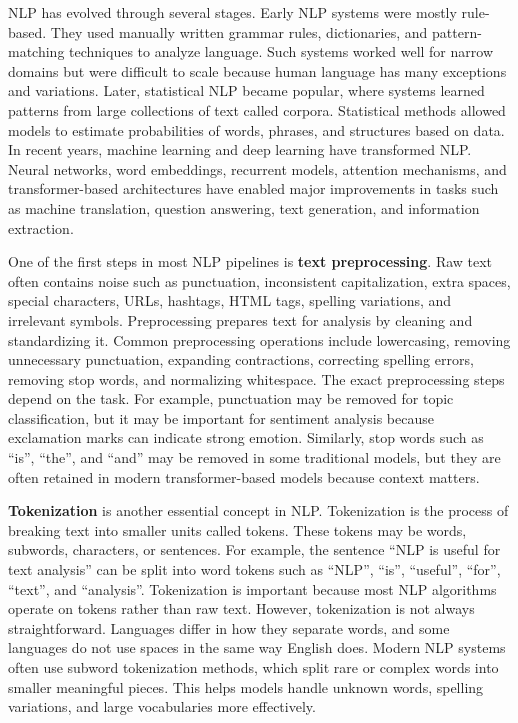 \documentclass[11pt]{article}
\begin{document}
NLP has evolved through several stages. Early NLP systems were mostly rule-based. They used manually written grammar rules, dictionaries, and pattern-matching techniques to analyze language. Such systems worked well for narrow domains but were difficult to scale because human language has many exceptions and variations. Later, statistical NLP became popular, where systems learned patterns from large collections of text called corpora. Statistical methods allowed models to estimate probabilities of words, phrases, and structures based on data. In recent years, machine learning and deep learning have transformed NLP. Neural networks, word embeddings, recurrent models, attention mechanisms, and transformer-based architectures have enabled major improvements in tasks such as machine translation, question answering, text generation, and information extraction.

One of the first steps in most NLP pipelines is \textbf{text preprocessing}. Raw text often contains noise such as punctuation, inconsistent capitalization, extra spaces, special characters, URLs, hashtags, HTML tags, spelling variations, and irrelevant symbols. Preprocessing prepares text for analysis by cleaning and standardizing it. Common preprocessing operations include lowercasing, removing unnecessary punctuation, expanding contractions, correcting spelling errors, removing stop words, and normalizing whitespace. The exact preprocessing steps depend on the task. For example, punctuation may be removed for topic classification, but it may be important for sentiment analysis because exclamation marks can indicate strong emotion. Similarly, stop words such as ``is'', ``the'', and ``and'' may be removed in some traditional models, but they are often retained in modern transformer-based models because context matters.

\textbf{Tokenization} is another essential concept in NLP. Tokenization is the process of breaking text into smaller units called tokens. These tokens may be words, subwords, characters, or sentences. For example, the sentence ``NLP is useful for text analysis'' can be split into word tokens such as ``NLP'', ``is'', ``useful'', ``for'', ``text'', and ``analysis''. Tokenization is important because most NLP algorithms operate on tokens rather than raw text. However, tokenization is not always straightforward. Languages differ in how they separate words, and some languages do not use spaces in the same way English does. Modern NLP systems often use subword tokenization methods, which split rare or complex words into smaller meaningful pieces. This helps models handle unknown words, spelling variations, and large vocabularies more effectively.
\end{document}
